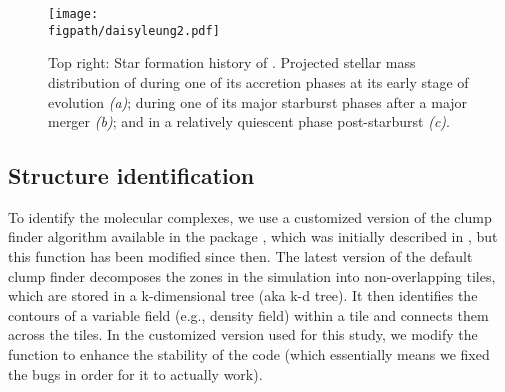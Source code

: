 \documentclass[iop]{emulateapj} %
\begin{document}
\begin{figure*}[htbp]
\centering
\texttt{[image: \\figpath/daisyleung2.pdf]}
\caption{
	Top right: Star formation history of \flower.
	Projected stellar mass distribution of \flower during one of its accretion phases
	at its early stage of evolution {\it (a)}; during one of its major starburst phases
	after a major merger {\it (b)}; and in a relatively quiescent phase post-starburst {\it (c)}.
\label{fig:SFH}}
\end{figure*}


\subsection{Structure identification} \label{sec:method}
To identify the molecular complexes, we use a customized version of the clump finder algorithm available in the  package  \citep{Turk2011a}, which was initially described in \citet{Smith09a}, but this function has been modified since then.
%
The latest version of the default  clump finder decomposes the zones in the simulation into non-overlapping tiles, which are stored in a k-dimensional tree (aka k-d tree). It then identifies the contours of a variable field (e.g., density field) within a tile and connects them across the tiles. 
In the customized version used for this study, we modify the function to enhance the stability of the code (which essentially means we fixed the bugs in order for it to actually work).
\end{document}
